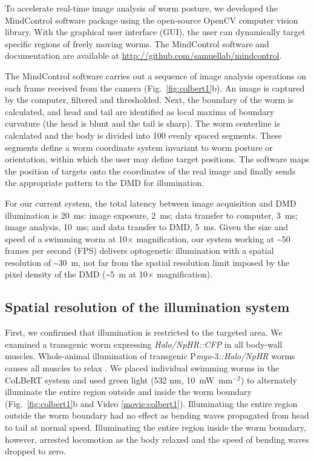 \begin{FPfigure}
\end{FPfigure}

To accelerate real-time image analysis of worm posture, we developed the MindControl software package using the open-source OpenCV computer vision library\citep{bradski_opencv_2000}. With the graphical user interface (GUI), the user can dynamically target specific regions of freely moving worms. The MindControl software and documentation are available at \href{http://github.com/samuellab/mindcontrol}{http://github.com/samuellab/mindcontrol}.


The MindControl software carries out a sequence of image analysis operations on each frame received from the camera (Fig.~\ref{fig:colbert1}b). An image is captured by the computer, filtered and thresholded. Next, the boundary of the worm is calculated, and head and tail are identified as local maxima of boundary curvature (the head is blunt and the tail is sharp). The worm centerline is calculated and the body is divided into 100 evenly spaced segments. These segments define a worm coordinate system invariant to worm posture or orientation, within which the user may define target positions. The software maps the position of targets onto the coordinates of the real image and finally sends the appropriate pattern to the DMD for illumination.

For our current system, the total latency between image acquisition and DMD illumination is 20~ms: image exposure, 2~ms; data transfer to computer, 3~ms; image analysis, 10~ms; and data transfer to DMD, 5~ms. Given the size and speed of a swimming worm at 10× magnification, our system working at \textasciitilde50 frames per second (FPS) delivers optogenetic illumination with a spatial resolution of \textasciitilde30~\textmu m, not far from the spatial resolution limit imposed by the pixel density of the DMD (\textasciitilde5~\textmu m at 10× magnification).

\subsection{Spatial resolution of the illumination system}
First, we confirmed that illumination is restricted to the targeted area. We examined a transgenic worm expressing \textit{Halo/NpHR::CFP} in all body-wall muscles. Whole-animal illumination of transgenic P\textit{myo-$3$::Halo/NpHR} worms causes all muscles to relax \citep{zhang_multimodal_2007}. We placed individual swimming worms in the CoLBeRT system and used green light (532 nm, 10~mW~mm$^{-2}$) to alternately illuminate the entire region outside and inside the worm boundary (Fig.~\ref{fig:colbert1}b and Video \ref{movie:colbert1}). Illuminating the entire region outside the worm boundary had no effect as bending waves propagated from head to tail at normal speed. Illuminating the entire region inside the worm boundary, however, arrested locomotion as the body relaxed and the speed of bending waves dropped to zero.

